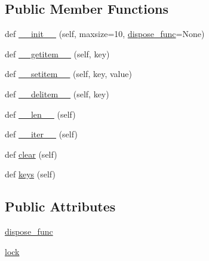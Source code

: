 \subsection*{Public Member Functions}
\begin{DoxyCompactItemize}
\item 
def \hyperlink{classpip_1_1__vendor_1_1urllib3_1_1__collections_1_1RecentlyUsedContainer_a78753b96981aa1d67e4de46545a15e9d}{\+\_\+\+\_\+init\+\_\+\+\_\+} (self, maxsize=10, \hyperlink{classpip_1_1__vendor_1_1urllib3_1_1__collections_1_1RecentlyUsedContainer_a6908905d7bf0d4f609c0be45f1759923}{dispose\+\_\+func}=None)
\item 
def \hyperlink{classpip_1_1__vendor_1_1urllib3_1_1__collections_1_1RecentlyUsedContainer_a2f9a0b12be09f80a9217b1cd38731371}{\+\_\+\+\_\+getitem\+\_\+\+\_\+} (self, key)
\item 
def \hyperlink{classpip_1_1__vendor_1_1urllib3_1_1__collections_1_1RecentlyUsedContainer_a4dfbdf0e6ca22811b5e541392fd53a72}{\+\_\+\+\_\+setitem\+\_\+\+\_\+} (self, key, value)
\item 
def \hyperlink{classpip_1_1__vendor_1_1urllib3_1_1__collections_1_1RecentlyUsedContainer_a39749d045cdca10aa493a3e1289a7826}{\+\_\+\+\_\+delitem\+\_\+\+\_\+} (self, key)
\item 
def \hyperlink{classpip_1_1__vendor_1_1urllib3_1_1__collections_1_1RecentlyUsedContainer_aa19b6fee7214fb10c95645fd5384f2ee}{\+\_\+\+\_\+len\+\_\+\+\_\+} (self)
\item 
def \hyperlink{classpip_1_1__vendor_1_1urllib3_1_1__collections_1_1RecentlyUsedContainer_ad7d9a829fe0774ab2e087dc1b60acfc9}{\+\_\+\+\_\+iter\+\_\+\+\_\+} (self)
\item 
def \hyperlink{classpip_1_1__vendor_1_1urllib3_1_1__collections_1_1RecentlyUsedContainer_a06b0bf88fc61087b84afd22b94d1d9b0}{clear} (self)
\item 
def \hyperlink{classpip_1_1__vendor_1_1urllib3_1_1__collections_1_1RecentlyUsedContainer_a47e1eb6af6289091b9e1116259cf6408}{keys} (self)
\end{DoxyCompactItemize}
\subsection*{Public Attributes}
\begin{DoxyCompactItemize}
\item 
\hyperlink{classpip_1_1__vendor_1_1urllib3_1_1__collections_1_1RecentlyUsedContainer_a6908905d7bf0d4f609c0be45f1759923}{dispose\+\_\+func}
\item 
\hyperlink{classpip_1_1__vendor_1_1urllib3_1_1__collections_1_1RecentlyUsedContainer_a52296cd6452d0b736b5099f93d5e739f}{lock}
\end{DoxyCompactItemize}

